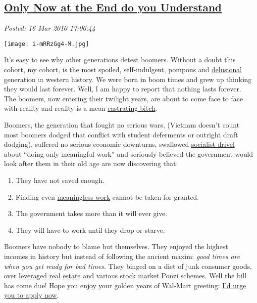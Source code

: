 %

\subsection*{\href{https://bakerjd99.wordpress.com/2010/03/16/only-now-at-the-end-do-you-understand/}{Only Now at the End do you Understand}}


\noindent\emph{Posted: 16 Mar 2010 17:06:44}
\vspace{6pt}

\captionsetup[floatingfigure]{labelformat=empty}
\begin{floatingfigure}[l]{0.25\textwidth}
\centering
\texttt{[image: i-mRRzGg4-M.jpg]}
\label{fig:466X0}
\end{floatingfigure} It's
easy to see why other generations detest
\href{http://tierneylab.blogs.nytimes.com/2007/03/05/the-ailing-or-wailing-baby-boomers/}{boomers}.
Without a doubt this cohort, my cohort, is the most spoiled,
self-indulgent, pompous and
\href{http://www.ageinplacetech.com/blog/metlife-are-boomers-middleof-self-delusion}{delusional}
generation in western history. We were born in boom times and grew up
thinking they would last forever. Well, I am happy to report that
nothing lasts forever. The boomers, now entering their twilight years,
are about to come face to face with reality and reality is a mean
\href{http://www.urbandictionary.com/products.php?defid=2255635}{castrating
bitch}.

Boomers, the generation that fought no serious wars, (Vietnam doesn't
count most boomers dodged that conflict with student deferments or
outright draft dodging), suffered no serious economic downturns,
swallowed
\href{http://www.marketoracle.co.uk/Article3357.html}{socialist
drivel} about ``doing only meaningful work'' and seriously believed the
government would look after them in their old age are now discovering
that:

\begin{enumerate}
\item
  They have not saved enough.
\item
  Finding even
  \href{http://www.artnotart.com/fluxus/wdemaria-meaninglesswork.html}{meaningless
  work} cannot be taken for granted.
\item
  The government takes more than it will ever give.
\item
  They will have to work until they drop or starve.
\end{enumerate}
Boomers have nobody to blame but themselves. They enjoyed the highest
incomes in history but instead of following the ancient maxim:
\emph{good times are when you get ready for bad times.} They binged on a
diet of junk consumer goods, over
\href{http://www.irvinehousingblog.com/blog/category/mortgage-fraud/}{leveraged
real estate} and various stock market Ponzi schemes. Well the bill has
come due! Hope you enjoy your golden years of Wal-Mart greeting:
\href{http://www.spartantailgate.com/forums/msu-red-cedar-message-board/302784-old-man-walmart-application.html}{I'd
urge you to apply now}.

